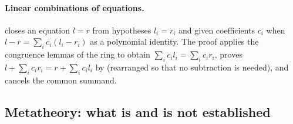 \paragraph{Linear combinations of equations.}
 closes an equation $l=r$ from hypotheses $l_i=r_i$ and given coefficients $c_i$ when $l-r=\sum_ic_i(l_i-r_i)$ as a polynomial identity.
The proof applies the congruence lemmas of the ring to obtain $\sum_ic_il_i=\sum_ic_ir_i$, proves $l+\sum_ic_ir_i=r+\sum_ic_il_i$ by  (rearranged so that no subtraction is needed), and cancels the common summand.

\subsection{Metatheory: what is and is not established}\label{sec:meta}

